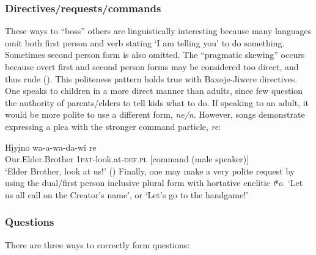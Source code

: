 \documentclass[output=paper]{LSP/langsci}
\begin{document}
\subsubsection{Directives/requests/commands} 
These ways to ``boss'' others are linguistically interesting because many languages omit both first person and verb stating `I am telling you' to do something.  Sometimes second person form is also omitted. The ``pragmatic skewing'' occurs because overt first and second person forms may be considered too direct, and thus rude (\citealt{Heath1998}). This politeness pattern holds true with Baxoje-Jiwere directives. One speaks to children in a more direct manner than adults, since few question the authority of parents/elders to tell kids what to do.  If speaking to an adult, it would be more polite to use a different form, \textit{ne/n}.  However, songs demonstrate expressing a plea with the stronger command particle, \textit{re}: 	     											

\ea \gll H\k{i}y\k{i}no    		 wa-a-wa-da-wi          re 	\\                                  	 
Our.Elder.Brother 1\textsc{pat}-look.at-\textsc{def.pl}  [command (male speaker)]	 \\	   	    
\trans `Elder Brother, look at us!'  (\citealt{Davidson1997})  	
\z				             
Finally, one may make a very polite request by using the dual/first person inclusive plural form with hortative enclitic \textit{tʰo}. `Let us all call on the Creator's name', or `Let's go to the handgame!'  		

\subsubsection{Questions} There are three ways to correctly form questions:  	
	          			
\end{document}
